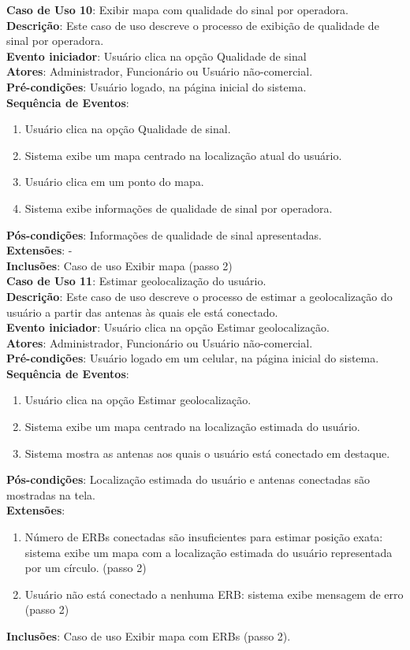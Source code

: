 \documentclass[]{politex}
\begin{document}
\noindent \textbf{Caso de Uso 10}: Exibir mapa com qualidade do sinal por
operadora. \\
\textbf{Descrição}: Este caso de uso descreve o processo de exibição de
qualidade de sinal por operadora. \\
\textbf{Evento iniciador}: Usuário clica na opção Qualidade de sinal \\
\textbf{Atores}: Administrador, Funcionário ou Usuário não-comercial. \\
\textbf{Pré-condições}: Usuário logado, na página inicial do sistema. \\
\textbf{Sequência de Eventos}:
\begin{enumerate}
\item Usuário clica na opção Qualidade de sinal.
\item Sistema exibe um mapa centrado na localização atual do usuário.
\item Usuário clica em um ponto do mapa.
\item Sistema exibe informações de qualidade de sinal por operadora.
\end{enumerate}
\textbf{Pós-condições}: Informações de qualidade de sinal apresentadas. \\
\textbf{Extensões}: - \\
\textbf{Inclusões}: Caso de uso Exibir mapa (passo 2) \\

\noindent \textbf{Caso de Uso 11}: Estimar geolocalização do usuário. \\
\textbf{Descrição}: Este caso de uso descreve o processo de estimar a
geolocalização do usuário a partir das antenas às quais ele está conectado. \\
\textbf{Evento iniciador}: Usuário clica na opção Estimar geolocalização. \\
\textbf{Atores}: Administrador, Funcionário ou Usuário não-comercial. \\
\textbf{Pré-condições}: Usuário logado em um celular, na página inicial do
sistema. \\
\textbf{Sequência de Eventos}:
\begin{enumerate}
\item Usuário clica na opção Estimar geolocalização.
\item Sistema exibe um mapa centrado na localização estimada do usuário.
\item Sistema mostra as antenas aos quais o usuário está conectado em destaque.
\end{enumerate}
\textbf{Pós-condições}: Localização estimada do usuário e antenas conectadas são
mostradas na tela. \\
\textbf{Extensões}:
\begin{enumerate}
\item Número de ERBs conectadas são insuficientes para estimar posição exata:
sistema exibe um mapa com a localização estimada do usuário representada por um
círculo. (passo 2)
\item Usuário não está conectado a nenhuma ERB: sistema exibe mensagem de erro
(passo 2)
\end{enumerate}
\textbf{Inclusões}: Caso de uso Exibir mapa com ERBs (passo 2). \\
\end{document}
